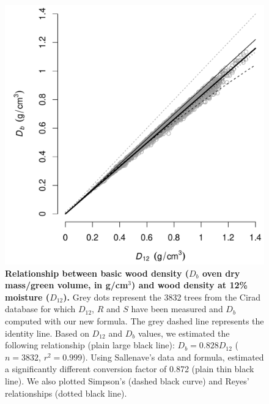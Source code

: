 \documentclass[a4paper, 12pt, leqno, dvipsnames]{article}\usepackage[]{graphicx}\usepackage[]{color}
\begin{document}
\begin{figure}[!ht] 
    \begin{center} 

      \includegraphics[width=12cm]{figs/Db-D12.pdf}

      \caption{\textbf{Relationship between basic wood density ($D_b$ oven dry mass/green
        volume, in g/cm$^3$) and wood density at 12\% moisture ($D_{12}$).} Grey dots
        represent the 3832 trees from the Cirad database for which $D_{12}$, $R$
        and $S$ have been measured and $D_b$ computed with our new formula. The grey dashed line represents the identity
        line. Based on $D_{12}$ and $D_b$ values, we estimated the following relationship (plain large black line): $D_b=0.828 D_{12}$ ($n=3832$,
        $r^2=0.999$). Using Sallenave's data and formula, \citet{Chave2006} estimated a significantly
        different conversion factor of 0.872 (plain thin black line). We also plotted Simpson's (dashed black curve) and Reyes' relationships (dotted black line).}

      \label{fig:Db-D12}
    \end{center}
\end{figure}

\newpage
\end{document}
